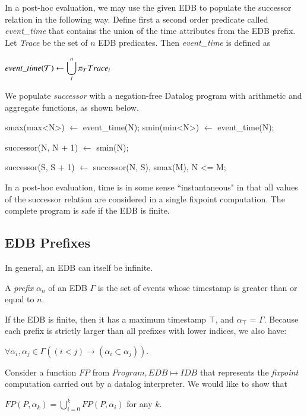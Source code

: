 In a post-hoc evaluation, we may use the given EDB to populate the successor relation in the following way.
Define first a second order predicate called \emph{event\_time} 
that contains the union of the time attributes from the EDB prefix. Let \emph{Trace} be the set of $n$ EDB predicates.  
Then \emph{event\_time} is defined as

$event\_time(\Tau) \leftarrow \displaystyle\bigcup_{i}^n \pi_{\Tau}Trace_{i}$

We populate \emph{successor} with a negation-free Datalog program with arithmetic and aggregate functions, as shown below.

\begin{Dedalus}
smax(max<N>) \(\leftarrow\) event\_time(N);
smin(min<N>) \(\leftarrow\) event\_time(N);

successor(N, N + 1) \(\leftarrow\) smin(N);

successor(S, S + 1) \(\leftarrow\) 
    successor(N, S),
    smax(M),
    N <= M;
\end{Dedalus}

In a post-hoc evaluation, time is in some sense ``instantaneous" in that all values of the successor relation are considered in a single
fixpoint computation.  The complete program is safe if the EDB is finite.

\subsection{EDB Prefixes}

In general, an EDB can itself be infinite. 

\begin{definition}
A \emph{prefix} $\alpha_{n}$ of an EDB $\Gamma$ is the set of events whose timestamp is greater than or equal to $n$.
\end{definition}

If the EDB is finite, then it has a maximum timestamp $\top$, and $\alpha_{\top}$ = $\Gamma$.  Because each prefix is strictly larger than
all prefixes with lower indices, we also have:

$\forall \alpha_{i}, \alpha_{j} \in \Gamma ((i < j) \to (\alpha_{i} \subset \alpha_{j}))$.

Consider a function $FP$ from $Program, EDB \mapsto IDB$ that represents the \emph{fixpoint} computation carried out by a datalog interpreter.
We would like to show that 

$FP(P, \alpha_{k}) =  \displaystyle \bigcup_{i=0}^{k} FP(P, \alpha_{i})$ for any $k$.  

